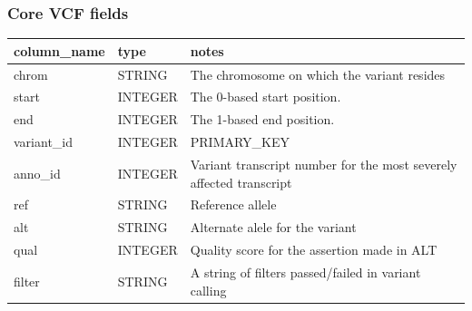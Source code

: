 \documentclass[letterpaper,10pt,english]{sphinxmanual}
\begin{document}
\subsubsection{Core VCF fields}
\label{content/database_schema:core-vcf-fields}
\begin{tabulary}{\linewidth}{|L|L|L|}
\hline
\textbf{
column\_name
} & \textbf{
type
} & \textbf{
notes
}\\\hline

chrom
 & 
STRING
 & 
The chromosome on which the variant resides
\\\hline

start
 & 
INTEGER
 & 
The 0-based start position.
\\\hline

end
 & 
INTEGER
 & 
The 1-based end position.
\\\hline

variant\_id
 & 
INTEGER
 & 
PRIMARY\_KEY
\\\hline

anno\_id
 & 
INTEGER
 & 
Variant transcript number for the most severely affected transcript
\\\hline

ref
 & 
STRING
 & 
Reference allele
\\\hline

alt
 & 
STRING
 & 
Alternate alele for the variant
\\\hline

qual
 & 
INTEGER
 & 
Quality score for the assertion made in ALT
\\\hline

filter
 & 
STRING
 & 
A string of filters passed/failed in variant calling
\\\hline
\end{tabulary}
\end{document}
